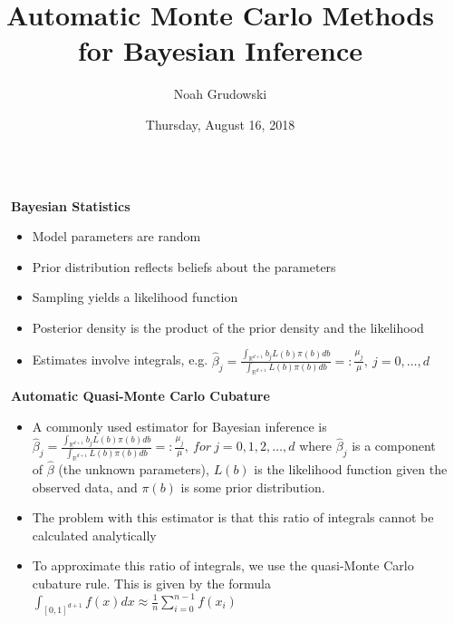 \documentclass[final,mathserif]{beamer}
\title{Automatic Monte Carlo Methods for Bayesian Inference}
\author{Noah Grudowski}
\institute{Applied Mathematics, Illinois Institute of
Technology}
\date{Thursday, August 16, 2018}
\newcommand{\blue}[1]{{\color{myblue}#1}}
\renewcommand{\blue}{\textcolor{blue!80!black}}
\begin{document}
\vspace*{-1.5ex}
\begin{frame}[fragile]

\begin{columns}[t]

\begin{column}{.02\linewidth}\end{column} %

\begin{column}{.31\linewidth} %



\begin{block}{\Large \textbf{\blue {Bayesian Statistics}}}
\begin{itemize}
\item Model parameters are random
\item \alert{Prior} distribution reflects beliefs about the parameters
\item Sampling yields a likelihood function
\item \alert{Posterior} density is the product of the prior density and the likelihood
\item Estimates involve integrals, e.g. $\hat{\beta}_j=\frac{\int_{\mathbb{R}^{d+1}}b_jL(b)\pi(b)db}{\int_{\mathbb{R}^{d+1}}L(b)\pi(b)db} =: \frac{\mu_j}{\mu},\  j=0, \ldots, d$
\end{itemize}
\end{block}

\vspace{.3in}

{\Large \textbf{\blue {Automatic Quasi-Monte Carlo Cubature}}}

\begin{block}{}
\begin{itemize}
\item A commonly used estimator for Bayesian inference is $\hat{\beta}_j=\frac{\int_{\mathbb{R}^{d+1}}b_jL(b)\pi(b)db}{\int_{\mathbb{R}^{d+1}}L(b)\pi(b)db} =: \frac{\mu_j}{\mu}, ~for\ j=0, 1, 2,\ldots, d$
where $\hat{\beta}_j$ is a component of $\hat{\beta}$ (the unknown parameters), $L(b)$ is the likelihood function given the observed data, and $\pi(b)$ is some prior distribution.
\item The problem with this estimator is that this ratio of integrals cannot be calculated analytically
\item To approximate this ratio of integrals, we use the quasi-Monte Carlo cubature rule.  This is given by the formula $\int_{[0, 1]^{d+1}}f(x)dx\approx \frac{1}{n} \sum_{i=0}^{n-1}f({x_i})$
\end{itemize}
\end{block}


\end{column}
\end{columns}
\end{frame}
\end{document}

